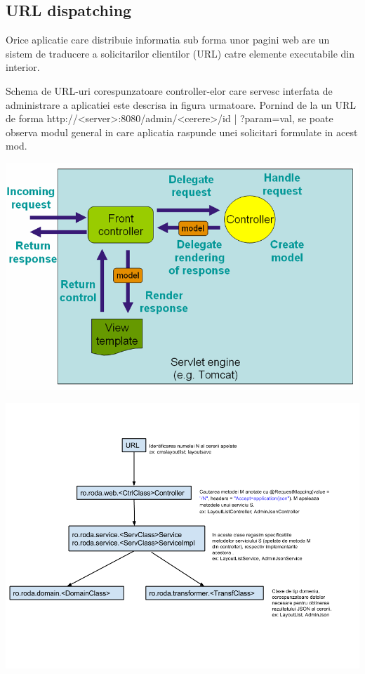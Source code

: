 \subsection{URL dispatching}

Orice aplicatie care distribuie informatia sub forma unor pagini web are un sistem de traducere a solicitarilor clientilor (URL) catre elemente executabile din interior. 

Schema de URL-uri corespunzatoare controller-elor care servesc interfata de administrare a aplicatiei este descrisa in figura urmatoare. 
Pornind de la un URL de forma http://<server>:8080/admin/<cerere>{/{id} | ?param=val}, se poate observa modul general in care aplicatia raspunde unei solicitari formulate in acest mod.

\bigskip

\begin{center}
\includegraphics[width=\textwidth]{mvc.png}
\end{center}

\bigskip

\begin{center}
\includegraphics[width=\textwidth]{roda_URL.png}
\end{center}

\bigskip

